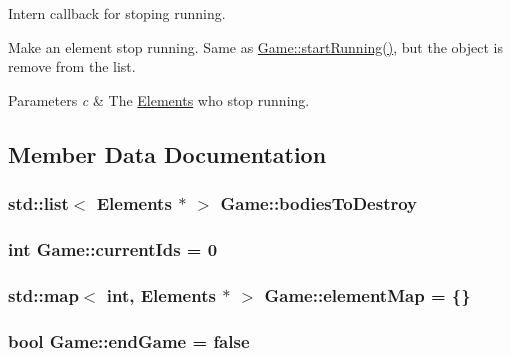 Intern callback for stoping running. 

Make an element stop running. Same as \hyperlink{class_game_a27ad8f2a6f8f098cc28377df13c4ec2e}{Game\-::start\-Running()}, but the object is remove from the list. 
\begin{DoxyParams}{Parameters}
{\em c} & The \hyperlink{class_elements}{Elements} who stop running. \\
\hline
\end{DoxyParams}


\subsection{Member Data Documentation}
\hypertarget{class_game_a078c48086258daf73a89bf4bde485969}{
\subsubsection[{bodies\-To\-Destroy}]{\setlength{\rightskip}{0pt plus 5cm}std\-::list$<$ {\bf Elements} $\ast$ $>$ Game\-::bodies\-To\-Destroy\hspace{0.3cm}{\ttfamily [static]}}}\label{class_game_a078c48086258daf73a89bf4bde485969}
\hypertarget{class_game_ae5bfa29230411c2605787261070909e6}{
\subsubsection[{current\-Ids}]{\setlength{\rightskip}{0pt plus 5cm}int Game\-::current\-Ids = 0\hspace{0.3cm}{\ttfamily [static]}}}\label{class_game_ae5bfa29230411c2605787261070909e6}
\hypertarget{class_game_a88aa459a01bbc438e665a19c53732c0e}{
\subsubsection[{element\-Map}]{\setlength{\rightskip}{0pt plus 5cm}std\-::map$<$ int, {\bf Elements} $\ast$ $>$ Game\-::element\-Map = \{\}\hspace{0.3cm}{\ttfamily [static]}}}\label{class_game_a88aa459a01bbc438e665a19c53732c0e}
\hypertarget{class_game_a6f05b1c88b1086147854b72defced72a}{
\subsubsection[{end\-Game}]{\setlength{\rightskip}{0pt plus 5cm}bool Game\-::end\-Game = false\hspace{0.3cm}{\ttfamily [static]}}}\label{class_game_a6f05b1c88b1086147854b72defced72a}
